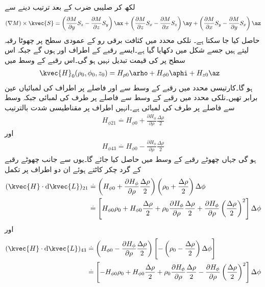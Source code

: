 لکھ کر صلیبی ضرب کے بعد ترتیب دینے سے
\begin{align*}
\left(\nabla M\right) \times \kvec{S}=\left(\frac{\partial M}{\partial y}S_z-\frac{\partial M}{\partial z}S_y\right)\ax+\left( \frac{\partial M}{\partial z}S_x-\frac{\partial M}{\partial x}S_z\right)\ay+\left(\frac{\partial M}{\partial x}S_y-\frac{\partial M}{\partial y}S_x\right)\az
\end{align*}
حاصل کیا جا سکتا ہے۔
نلکی محدد میں  کثافت برقی رو کے عمودی سطح پر چھوٹا رقبہ لیتے ہیں جسے شکل  میں دکھایا گیا ہے۔ایسے رقبے کے اطراف  اور  ہوں گے جبکہ اس سطح پر  کی قیمت تبدیل نہیں ہو گی۔اس رقبے کے وسط میں
\begin{align*}
\kvec{H}_0(\rho_0,\phi_0,z_0)&=H_{\rho 0}\arho+H_{\phi 0}\aphi+H_{z 0}\az
\end{align*}
ہو گا۔کارتیسی محدد میں رقبے کے وسط سے  اور  فاصلے پر اطراف کی لمبائیاں عین برابر تھیں۔نلکی محدد میں رقبے کے وسط سے  فاصلے پر طرف کی لمبائی  جبکہ  وسط سے  فاصلے پر طرف کی لمبائی  ہے۔انہیں اطراف پر مقناطیسی شدت  بالترتیب
\begin{align*}
H_{\phi 21}\overset{.}{=}H_{\phi 0}+\frac{\partial H_\phi}{\partial \rho}\frac{\Delta \rho}{2}
\end{align*}
اور
\begin{align*}
H_{\phi 43}\overset{.}{=}H_{\phi 0}-\frac{\partial H_\phi}{\partial \rho}\frac{\Delta \rho}{2}
\end{align*}
ہو گی جہاں  چھوٹے رقبے کے وسط میں حاصل کیا جائے گا۔یوں  سے  جانب چھوٹے رقبے کے گرد چکر کاٹتے ہوئے ان دو اطراف پر تکمل
\begin{align*}
(\kvec{H} \cdot \dif \kvec{L})_{21}&\overset{.}{=}\left(H_{\phi 0}+\frac{\partial H_\phi}{\partial \rho}\frac{\Delta \rho}{2} \right)\left(\rho_0 +\frac{\Delta \rho}{2} \right)\Delta \phi\\
&\overset{.}{=}\left[H_{\phi 0} \rho_0+H_{\phi 0} \frac{\Delta \rho}{2}+\rho_0 \frac{\partial H_\phi}{\partial \rho}\frac{\Delta \rho}{2}+\frac{\partial H_\phi}{\partial \rho} \left(\frac{\Delta \rho}{2} \right)^2\right]\Delta \phi
\end{align*}
اور
\begin{align*}
(\kvec{H} \cdot \dif \kvec{L})_{43}&\overset{.}{=}\left(H_{\phi 0}-\frac{\partial H_\phi}{\partial \rho}\frac{\Delta \rho}{2} \right)\left[-\left(\rho_0 -\frac{\Delta \rho}{2} \right)\Delta \phi\right]\\
&\overset{.}{=}\left[-H_{\phi 0} \rho_0+H_{\phi 0} \frac{\Delta \rho}{2}+\rho_0 \frac{\partial H_\phi}{\partial \rho}\frac{\Delta \rho}{2}-\frac{\partial H_\phi}{\partial \rho} \left(\frac{\Delta \rho}{2} \right)^2\right]\Delta \phi
\end{align*}

